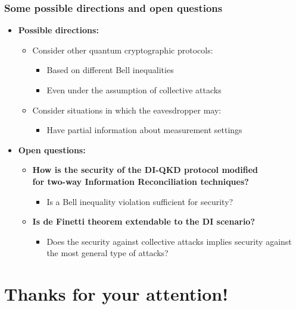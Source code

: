 \documentclass{beamer}
\begin{document}
    \begin{frame}
        \frametitle{\Large Some possible directions and open questions}

        \vspace{3.5ex}
        \begin{itemize}
            \item \textbf{Possible directions:}
            \begin{itemize}
                \item Consider other quantum cryptographic protocols:
                \begin{itemize}
                    \item Based on different Bell inequalities
                    \item Even under the assumption of collective attacks 
                \end{itemize}
                \item Consider situations in which the eavesdropper may:
                \begin{itemize}
                    \item Have partial information about measurement settings
                \end{itemize}
            \end{itemize}
            \item \textbf{Open questions:}
            \begin{itemize}
                \item \textbf{How is the security of the DI-QKD protocol modified\\ for two-way Information Reconciliation techniques?}
                \begin{itemize}
                    \item Is a Bell inequality violation sufficient for security?
                \end{itemize}
                \item \textbf{Is de Finetti theorem extendable to the DI scenario?}
                \begin{itemize}
                    \item Does the security against collective attacks implies security against the most general type of attacks?
                \end{itemize}
            \end{itemize}
        \end{itemize}
        
    \end{frame}


    \section{Thanks for your attention!}
\end{document}
